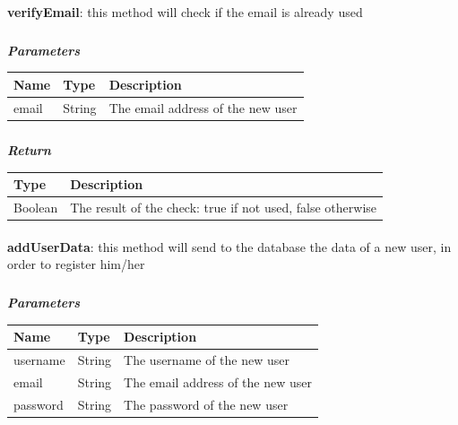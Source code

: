 					\paragraph{}
					\vspace{-2mm}
							\textbf{verifyEmail}: this method will check if the email is already used
							\subparagraph{}
							\vspace{-3mm}
							\textit{\textbf{Parameters}}
							\vspace{-2mm}
								\begin{table}[!h]
									\begin{tabular}{L{0.2\textwidth}L{0.15\textwidth}L{0.45\textwidth}}
										\toprule
										\textbf{Name} & \textbf{Type} & \textbf{Description} \\
										\midrule
								  		email & String & The email address of the new user \\
								 		\bottomrule
									\end{tabular}
								\end{table}
							\vspace{-6mm}
							\subparagraph{}
							\vspace{-3mm}
							\textit{\textbf{Return}}
							\vspace{-2mm}
								\begin{table}[!h]
									\begin{tabular}{L{0.15\textwidth}L{0.45\textwidth}}
										\toprule
									 	\textbf{Type} & \textbf{Description} \\
										\midrule
								  		Boolean & The result of the check: true if not used, false otherwise\\
								 		\bottomrule
									\end{tabular}
								\end{table}
							\vspace{-6mm}
							
					\paragraph{}
					\vspace{-2mm}
							\textbf{addUserData}: this method will send to the database the data of a new user, in order to register him/her
							\subparagraph{}
							\vspace{-3mm}
							\textit{\textbf{Parameters}}
							\vspace{-2mm}
								\begin{table}[!h]
									\begin{tabular}{L{0.2\textwidth}L{0.15\textwidth}L{0.45\textwidth}}
										\toprule
										\textbf{Name} & \textbf{Type} & \textbf{Description} \\
										\midrule
								  		username & String & The username of the new user \\
								  		email & String & The email address of the new user \\
								  		password & String & The password of the new user \\
								 		\bottomrule
									\end{tabular}
								\end{table}
					

